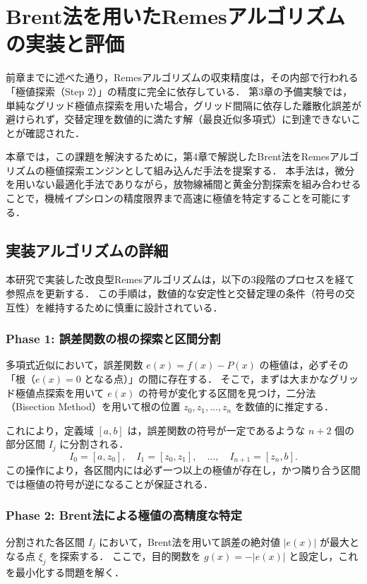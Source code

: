 \section{Brent法を用いたRemesアルゴリズムの実装と評価}
\label{sec:brent_remes_impl}

前章までに述べた通り，Remesアルゴリズムの収束精度は，その内部で行われる「極値探索（Step 2）」の精度に完全に依存している．
第3章の予備実験では，単純なグリッド極値点探索を用いた場合，グリッド間隔に依存した離散化誤差が避けられず，交替定理を数値的に満たす解（最良近似多項式）に到達できないことが確認された．

本章では，この課題を解決するために，第4章で解説したBrent法をRemesアルゴリズムの極値探索エンジンとして組み込んだ手法を提案する．
本手法は，微分を用いない最適化手法でありながら，放物線補間と黄金分割探索を組み合わせることで，機械イプシロンの精度限界まで高速に極値を特定することを可能にする．

\subsection{実装アルゴリズムの詳細}
  \label{subsec:impl_algorithm}
本研究で実装した改良型Remesアルゴリズムは，以下の3段階のプロセスを経て参照点を更新する．
この手順は，数値的な安定性と交替定理の条件（符号の交互性）を維持するために慎重に設計されている．

\subsubsection{Phase 1: 誤差関数の根の探索と区間分割}
多項式近似において，誤差関数 $e(x) = f(x) - P(x)$ の極値は，必ずその「根（$e(x)=0$ となる点）」の間に存在する．
そこで，まずは大まかなグリッド極値点探索を用いて $e(x)$ の符号が変化する区間を見つけ，二分法（Bisection Method）を用いて根の位置 $z_0, z_1, \dots, z_{n}$ を数値的に推定する．

これにより，定義域 $[a, b]$ は，誤差関数の符号が一定であるような $n+2$ 個の部分区間 $I_j$ に分割される．
\[
I_0 = [a, z_0], \quad I_1 = [z_0, z_1], \quad \dots, \quad I_{n+1} = [z_n, b].
\]
この操作により，各区間内には必ず一つ以上の極値が存在し，かつ隣り合う区間では極値の符号が逆になることが保証される．

\subsubsection{Phase 2: Brent法による極値の高精度な特定}
分割された各区間 $I_j$ において，Brent法を用いて誤差の絶対値 $|e(x)|$ が最大となる点 $\xi_j$ を探索する．
ここで，目的関数を $g(x) = -|e(x)|$ と設定し，これを最小化する問題を解く．

